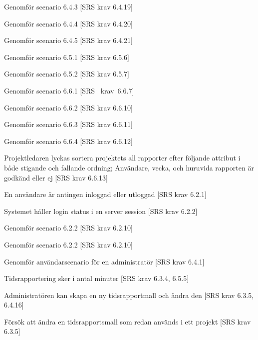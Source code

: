 \documentclass[a4paper]{article}
\begin{document}
\begin{appendices}
\begin{ST}
\item
Genomför scenario 6.4.3 [SRS krav 6.4.19]

\item
Genomför scenario 6.4.4 [SRS krav 6.4.20]

\item
Genomför scenario 6.4.5 [SRS krav 6.4.21]

\item
Genomför scenario 6.5.1 [SRS krav 6.5.6]

\item
Genomför scenario 6.5.2 [SRS krav 6.5.7]

\item
Genomför scenario 6.6.1 [SRS~ krav~6.6.7]

\item
Genomför scenario 6.6.2 [SRS krav 6.6.10]

\item
Genomför scenario 6.6.3 [SRS krav 6.6.11]

\item
Genomför scenario 6.6.4 [SRS krav 6.6.12]

\item
Projektledaren lyckas sortera projektets all rapporter efter följande attribut i både stigande och fallande ordning; Användare, vecka, och huruvida rapporten är godkänd eller ej [SRS krav 6.6.13]


\item
En användare är antingen inloggad eller utloggad [SRS krav 6.2.1]

\item
Systemet håller login status i en server session [SRS krav 6.2.2]

\item
Genomför scenario 6.2.2 [SRS krav 6.2.10]

\item
Genomför scenario 6.2.2 [SRS krav 6.2.10]

\item
Genomför användarscenario för en administratör [SRS krav 6.4.1]

\item
Tidsrapportering sker i antal minuter [SRS krav 6.3.4, 6.5.5]

\item
Administratören kan skapa en ny tidsrapportmall och ändra den [SRS krav 6.3.5, 6.4.16]

\item
Försök att ändra en tidsrapportsmall som redan används i ett projekt [SRS krav 6.3.5]


\end{ST}
\end{appendices}
\end{document}
